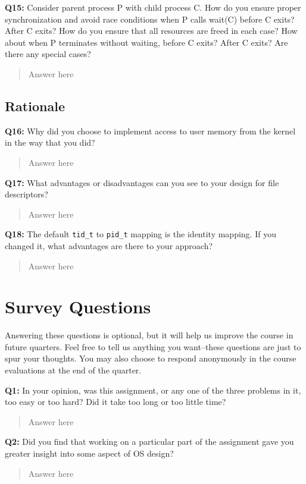 \documentclass[a4paper,11pt]{paper}
\begin{document}
\textbf{Q15:} Consider parent process P with child process C.  How do you ensure proper synchronization and avoid race conditions when P calls wait(C) before C exits?  After C exits?  How do you ensure that all resources are freed in each case? How about when P terminates without waiting, before C exits?  After C exits?  Are there any special cases?
\begin{quote}
  Answer here
\end{quote}

\subsection{Rationale}

\textbf{Q16:} Why did you choose to implement access to user memory from the kernel in the way that you did?
\begin{quote}
  Answer here
\end{quote}

\textbf{Q17:} What advantages or disadvantages can you see to your design for file descriptors?
\begin{quote}
  Answer here
\end{quote}

\textbf{Q18:} The default \texttt{tid\_t} to \texttt{pid\_t} mapping is the identity mapping. If you changed it, what advantages are there to your approach?
\begin{quote}
  Answer here
\end{quote}


\section{Survey Questions}

Answering these questions is optional, but it will help us improve the course in future quarters.  Feel free to tell us anything you want--these questions are just to spur your thoughts.  You may also choose to respond anonymously in the course evaluations at the end of the quarter.

\textbf{Q1:} In your opinion, was this assignment, or any one of the three problems in it, too easy or too hard?  Did it take too long or too little time?
\begin{quote}
  Answer here
\end{quote}

\textbf{Q2:} Did you find that working on a particular part of the assignment gave you greater insight into some aspect of OS design?
\begin{quote}
  Answer here
\end{quote}
\end{document}
